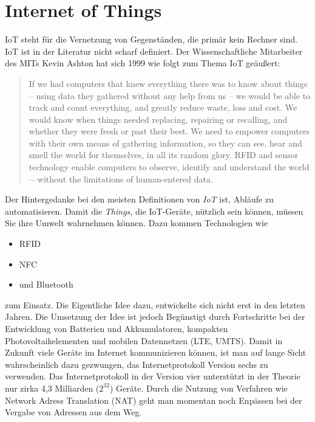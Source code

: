 \section{Internet of Things}
\ac{IoT} steht für die Vernetzung von Gegenständen, die primär kein Rechner sind. \ac{IoT} ist in der Literatur nicht scharf definiert. Der Wissenschaftliche Mitarbeiter des MITs Kevin Ashton hat sich 1999 wie folgt zum Thema \ac{IoT} geäußert: 
\begin{quote}
If we had computers that knew everything there was to know about things -- using data they gathered 
without any help from us -- we would be able to track and count everything, and greatly reduce waste, 
loss and cost. We would know when things needed replacing, repairing or recalling, and whether they 
were fresh or past their best. We need to empower computers with their own means of gathering 
information, so they can see, hear and smell the world for themselves, in all its random glory. RFID and 
sensor technology enable computers to observe, identify and understand the world—without the 
limitations of human-entered data.
\end{quote}

Der Hintergedanke bei den meisten Definitionen von \textit{\ac{IoT}} ist, Abläufe zu automatisieren. Damit die \textit{Things}, die \ac{IoT}-Geräte, nützlich sein können, müssen Sie ihre Umwelt wahrnehmen können. Dazu kommen Technologien wie 
\begin{itemize}
\item \ac{RFID}
\item \ac{NFC}
\item und Bluetooth
\end{itemize} 
zum Einsatz.
Die Eigentliche Idee dazu, entwickelte sich nicht erst in den letzten Jahren. Die Umsetzung der Idee ist jedoch Begünstigt durch Fortschritte bei der Entwicklung von Batterien und Akkumulatoren, kompakten Photovoltaikelementen und mobilen Datennetzen (LTE, UMTS). 
Damit in Zukunft viele Geräte im Internet kommunizieren können, ist man auf lange Sicht wahrscheinlich dazu gezwungen, das Internetprotokoll Version sechs zu verwenden. Das Internetprotokoll in der Version vier unterstützt in der Theorie nur zirka 4,3 Milliarden ($2^{32}$) Geräte. Durch die Nutzung von Verfahren wie Network Adress Translation (NAT) geht man momentan noch Enpässen bei der Vergabe von Adressen aus dem Weg. 

